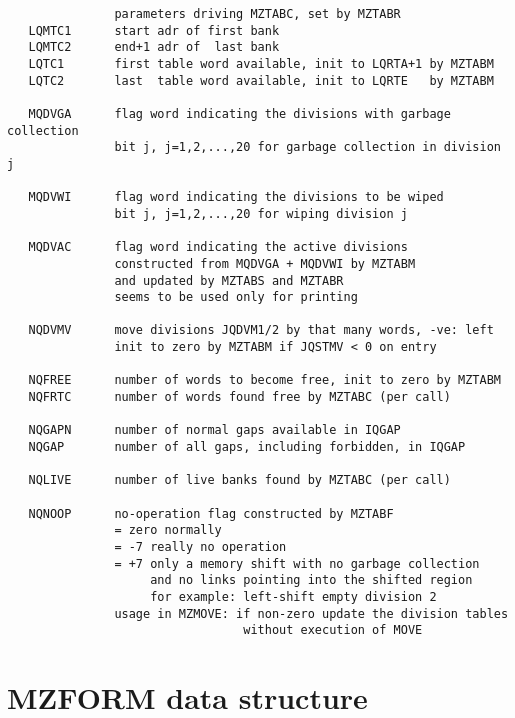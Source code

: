 \begin{verbatim}
               parameters driving MZTABC, set by MZTABR
   LQMTC1      start adr of first bank
   LQMTC2      end+1 adr of  last bank
   LQTC1       first table word available, init to LQRTA+1 by MZTABM
   LQTC2       last  table word available, init to LQRTE   by MZTABM

   MQDVGA      flag word indicating the divisions with garbage collection
               bit j, j=1,2,...,20 for garbage collection in division j

   MQDVWI      flag word indicating the divisions to be wiped
               bit j, j=1,2,...,20 for wiping division j

   MQDVAC      flag word indicating the active divisions
               constructed from MQDVGA + MQDVWI by MZTABM
               and updated by MZTABS and MZTABR
               seems to be used only for printing

   NQDVMV      move divisions JQDVM1/2 by that many words, -ve: left
               init to zero by MZTABM if JQSTMV < 0 on entry

   NQFREE      number of words to become free, init to zero by MZTABM
   NQFRTC      number of words found free by MZTABC (per call)

   NQGAPN      number of normal gaps available in IQGAP
   NQGAP       number of all gaps, including forbidden, in IQGAP

   NQLIVE      number of live banks found by MZTABC (per call)

   NQNOOP      no-operation flag constructed by MZTABF
               = zero normally
               = -7 really no operation
               = +7 only a memory shift with no garbage collection
                    and no links pointing into the shifted region
                    for example: left-shift empty division 2
               usage in MZMOVE: if non-zero update the division tables
                                 without execution of MOVE
\end{verbatim} 

\section{MZFORM data structure}


